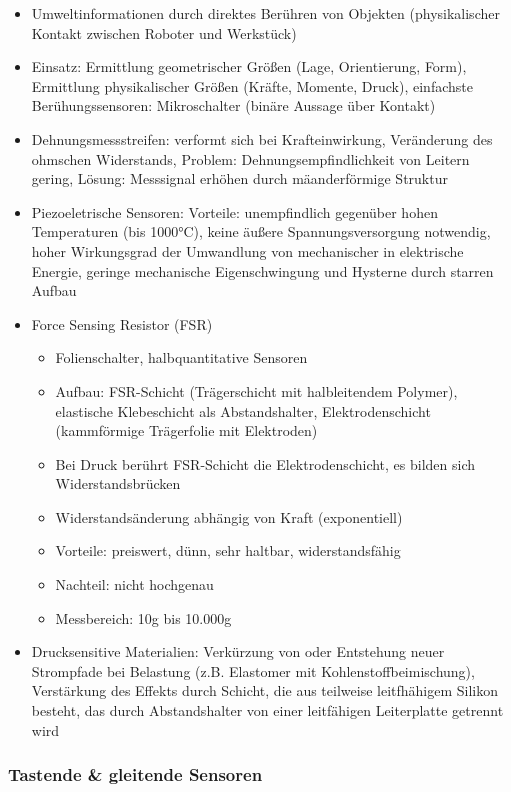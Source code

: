 \documentclass[paper=a4, fontsize=11pt]{scrartcl} %
\numberwithin{equation}{section} %
\numberwithin{figure}{section} %
\numberwithin{table}{section} %
\begin{document}
\begin{itemize}
\item Umweltinformationen durch direktes Berühren von Objekten (physikalischer Kontakt zwischen Roboter und Werkstück)
\item Einsatz: Ermittlung geometrischer Größen (Lage, Orientierung, Form), Ermittlung physikalischer Größen (Kräfte, Momente, Druck), einfachste Berühungssensoren: Mikroschalter (binäre Aussage über Kontakt)
\item Dehnungsmessstreifen: verformt sich bei Krafteinwirkung, Veränderung des ohmschen Widerstands, Problem: Dehnungsempfindlichkeit von Leitern gering, Lösung: Messsignal erhöhen durch mäanderförmige Struktur
\item Piezoeletrische Sensoren: Vorteile: unempfindlich gegenüber hohen Temperaturen (bis 1000°C), keine äußere Spannungsversorgung notwendig, hoher Wirkungsgrad der Umwandlung von mechanischer in elektrische Energie, geringe mechanische Eigenschwingung und Hysterne durch starren Aufbau
\item Force Sensing Resistor (FSR)
\begin{itemize}
\item Folienschalter, halbquantitative Sensoren
\item Aufbau: FSR-Schicht (Trägerschicht mit halbleitendem Polymer), elastische Klebeschicht als Abstandshalter, Elektrodenschicht (kammförmige Trägerfolie mit Elektroden)
\item Bei Druck berührt FSR-Schicht die Elektrodenschicht, es bilden sich Widerstandsbrücken
\item Widerstandsänderung abhängig von Kraft (exponentiell)
\item Vorteile: preiswert, dünn, sehr haltbar, widerstandsfähig
\item Nachteil: nicht hochgenau
\item Messbereich: 10g bis 10.000g
\end{itemize}
\item Drucksensitive Materialien: Verkürzung von oder Entstehung neuer Strompfade bei Belastung (z.B. Elastomer mit Kohlenstoffbeimischung), Verstärkung des Effekts durch Schicht, die aus teilweise leitfhähigem Silikon besteht, das durch Abstandshalter von einer leitfähigen Leiterplatte getrennt wird
\end{itemize}

\subsubsection{Tastende \& gleitende Sensoren}
\end{document}
